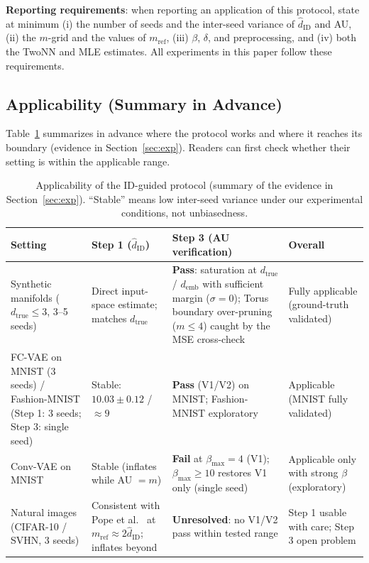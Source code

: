 \documentclass[make,article,submit,pdftex,moreauthors]{Definitions/mdpi}
\newcommand{\hatdID}{\hat{d}_{\mathrm{ID}}}
\newcommand{\dtrue}{d_{\mathrm{true}}}
\newcommand{\demb}{d_{\mathrm{emb}}}
\begin{document}
\textbf{Reporting requirements}:
when reporting an application of this protocol, state at minimum
(i) the number of seeds and the inter-seed variance of $\hatdID$ and AU,
(ii) the $m$-grid and the values of $m_{\mathrm{ref}}$,
(iii) $\beta$, $\delta$, and preprocessing, and
(iv) both the TwoNN and MLE estimates.
All experiments in this paper follow these requirements.

\subsection{Applicability (Summary in Advance)}\label{sec:protocol_applicability}

Table~\ref{tab:applicability} summarizes in advance where the protocol works
and where it reaches its boundary (evidence in Section~\ref{sec:exp}).
Readers can first check whether their setting is within the applicable
range.

\begin{table}[H]
\caption{Applicability of the ID-guided protocol (summary of the evidence in
Section~\ref{sec:exp}). ``Stable'' means low inter-seed variance under our
experimental conditions, not unbiasedness.}
\label{tab:applicability}
\small
\begin{tabular}{p{2.6cm}p{2.9cm}p{3.1cm}p{3.6cm}}
\toprule
\textbf{Setting} & \textbf{Step 1 ($\hatdID$)} & \textbf{Step 3 (AU verification)} & \textbf{Overall} \\
\midrule
Synthetic manifolds ($\dtrue \leq 3$, 3--5 seeds) & Direct input-space estimate; matches $\dtrue$ & \textbf{Pass}: saturation at $\dtrue$ / $\demb$ with sufficient margin ($\sigma = 0$); Torus boundary over-pruning ($m \leq 4$) caught by the MSE cross-check & Fully applicable (ground-truth validated) \\
\addlinespace
FC-VAE on MNIST (3 seeds) / Fashion-MNIST (Step 1: 3 seeds; Step 3: single seed) & Stable: $10.03 \pm 0.12$ / $\approx 9$ & \textbf{Pass} (V1/V2) on MNIST; Fashion-MNIST exploratory & Applicable (MNIST fully validated) \\
\addlinespace
Conv-VAE on MNIST & Stable (inflates while AU $= m$) & \textbf{Fail} at $\beta_{\max} = 4$ (V1); $\beta_{\max} \geq 10$ restores V1 only (single seed) & Applicable only with strong $\beta$ (exploratory) \\
\addlinespace
Natural images (CIFAR-10 / SVHN, 3 seeds) & Consistent with Pope et al.~\cite{pope2021intrinsic} at $m_{\mathrm{ref}} \approx 2\hatdID$; inflates beyond & \textbf{Unresolved}: no V1/V2 pass within tested range & Step 1 usable with care; Step 3 open problem \\
\bottomrule
\end{tabular}
\end{table}
\end{document}
